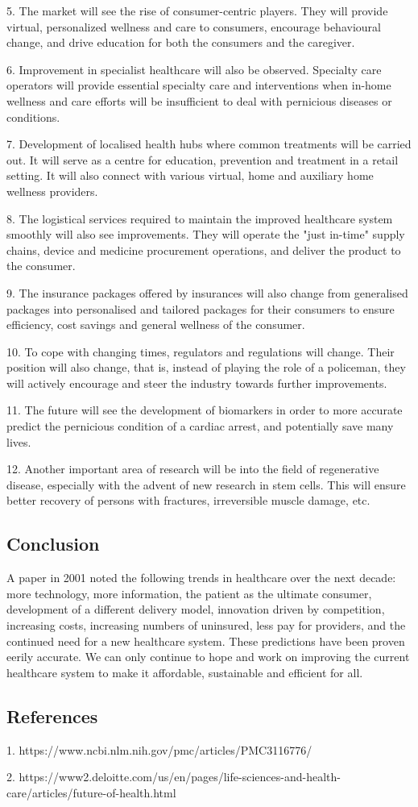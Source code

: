 \documentclass[11pt]{article}
\begin{document}
5. The market will see the rise of consumer-centric players. They will provide virtual, personalized wellness and care to consumers, encourage behavioural change, and drive education for both the consumers and the caregiver.

6. Improvement in specialist healthcare will also be observed. Specialty care operators will provide essential specialty care and interventions when in-home wellness and care efforts will be insufficient to deal with pernicious diseases or conditions.

7. Development of localised health hubs where common treatments will be carried out. It will serve as a centre for education, prevention and treatment in a retail setting. It will also connect with various virtual, home and auxiliary home wellness providers.

8. The logistical services required to maintain the improved healthcare system smoothly will also see improvements. They will operate the "just in-time" supply chains, device and medicine procurement operations, and deliver the product to the consumer.

9. The insurance packages offered by insurances will also change from generalised packages into personalised and tailored packages for their consumers to ensure efficiency, cost savings and general wellness of the consumer.

10. To cope with changing times, regulators and regulations will change. Their position will also change, that is, instead of playing the role of a policeman, they will actively encourage and steer the industry towards further improvements.

11. The future will see the development of biomarkers in order to more accurate predict the pernicious condition of a cardiac arrest, and potentially save many lives. 

12. Another important area of research will be into the field of regenerative disease, especially with the advent of new research in stem cells. This will ensure better recovery of persons with fractures, irreversible muscle damage, etc. 

\subsection*{Conclusion}

A paper in 2001 noted the following trends in healthcare over the next decade: more technology, more information, the patient as the ultimate consumer, development of a different delivery model, innovation driven by competition, increasing costs, increasing numbers of uninsured, less pay for providers, and the continued need for a new healthcare system. These predictions have been proven eerily accurate. We can only continue to hope and work on improving the current healthcare system to make it affordable, sustainable and efficient for all.

\subsection*{References}

1. https://www.ncbi.nlm.nih.gov/pmc/articles/PMC3116776/

2. https://www2.deloitte.com/us/en/pages/life-sciences-and-health-care/articles/future-of-health.html
\end{document}
